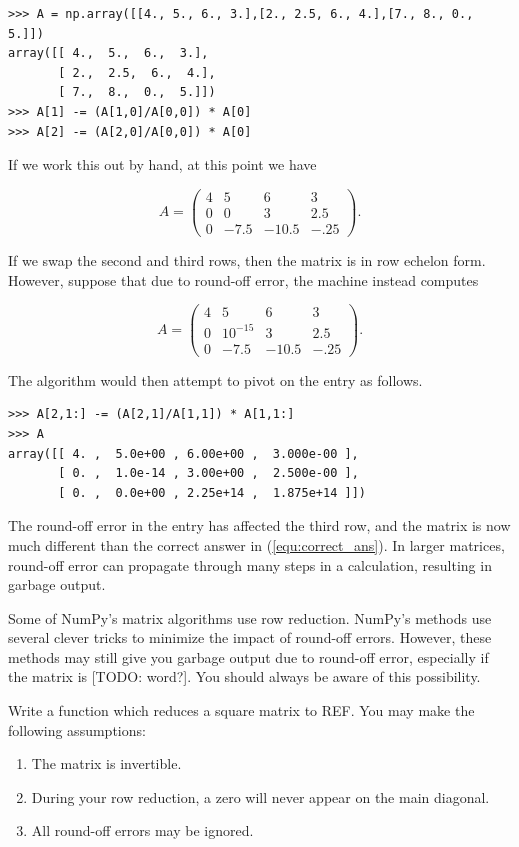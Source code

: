 \begin{lstlisting}
>>> A = np.array([[4., 5., 6., 3.],[2., 2.5, 6., 4.],[7., 8., 0., 5.]])
array([[ 4.,  5.,  6.,  3.],
       [ 2.,  2.5,  6.,  4.],
       [ 7.,  8.,  0.,  5.]])
>>> A[1] -= (A[1,0]/A[0,0]) * A[0]
>>> A[2] -= (A[2,0]/A[0,0]) * A[0]
\end{lstlisting}

If we work this out by hand, at this point we have

\begin{equation}\label{equ:correct_ans}
A = \begin{pmatrix}
4&5&6&3 \\
0&0&3&2.5 \\
0&-7.5&-10.5&-.25
\end{pmatrix}.
\end{equation}

If we swap the second and third rows, then the matrix is in row echelon form. However, suppose that due to round-off error, the machine instead computes

\[
A = \begin{pmatrix}
4&5&6&3 \\
0&10^{-15}&3&2.5 \\
0&-7.5&-10.5&-.25
\end{pmatrix}.
\]

The algorithm would then attempt to pivot on the  entry as follows.

\begin{lstlisting}
>>> A[2,1:] -= (A[2,1]/A[1,1]) * A[1,1:]
>>> A
array([[ 4. ,  5.0e+00 , 6.00e+00 ,  3.000e-00 ],
       [ 0. ,  1.0e-14 , 3.00e+00 ,  2.500e-00 ],
       [ 0. ,  0.0e+00 , 2.25e+14 ,  1.875e+14 ]])
\end{lstlisting}

The round-off error in the  entry has affected the third
row, and the matrix is now much different than the correct answer in (\ref{equ:correct_ans}). In larger matrices, round-off error can propagate through many steps in a calculation, resulting in garbage output.

Some of NumPy's matrix algorithms use row reduction. NumPy's methods use several clever tricks to minimize the impact of round-off errors. However, these methods may still give you garbage output due to round-off error, especially if the matrix is [TODO: word?]. You should always be aware of this possibility.

\begin{problem}
\label{prob:REF}
Write a function which reduces a square matrix to REF. You may make the following assumptions:
\begin{enumerate}
\item The matrix is invertible.
\item During your row reduction, a zero will never appear on the main diagonal.
\item All round-off errors may be ignored.
\end{enumerate}
\end{problem}

